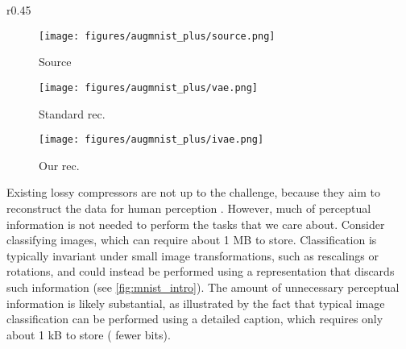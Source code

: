 \documentclass[final]{article}
\begin{document}
\begin{wrapfigure}{r}{0.45\textwidth}
\vspace{-\baselineskip}
\centering
\captionsetup[subfigure]{labelformat=empty}

\begin{minipage}{0.45\textwidth}
\centering
\begin{subfigure}[h]{0.32\columnwidth}
 \centering
 \texttt{[image: figures/augmnist\_plus/source.png]}
\caption{Source}
\end{subfigure}
\begin{subfigure}[h]{0.32\columnwidth}
 \centering
 \texttt{[image: figures/augmnist\_plus/vae.png]}
\caption{Standard rec.}
\end{subfigure}
\begin{subfigure}[h]{0.32\columnwidth}
 \centering
 \texttt{[image: figures/augmnist\_plus/ivae.png]}
\caption{Our rec.}
\end{subfigure}
 \vspace*{-0.5em}
\addtocounter{figure}{-1} 
\end{minipage}\vspace{-2\baselineskip}

\end{wrapfigure}
 
Existing lossy compressors are not up to the challenge, because they aim to reconstruct the data for human perception \cite{johnston_transform_1988,heeger_model_1995,lee_perceptual_2012,blau_rethinking_2019,pan_digital_1993,mentzer_high-fidelity_2020}. 
However, much of perceptual information is not needed to perform the tasks that we care about.
Consider classifying images, which can require about 1 MB to store. 
Classification is typically invariant under small image transformations, such as rescalings or rotations, and could instead be performed using a representation that discards such information (see \cref{fig:mnist_intro}). 
The amount of unnecessary perceptual information is likely substantial, as illustrated by the fact that typical image classification can be performed using a detailed caption, which requires only about 1 kB to store ( fewer bits).
\end{document}
